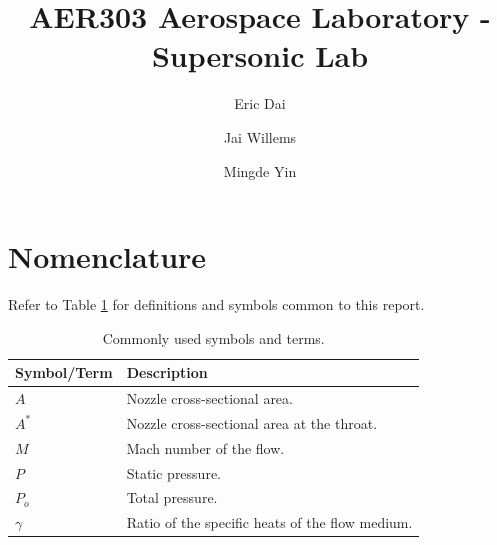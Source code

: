 \documentclass[runningheads]{llncs}
\begin{document}
\title{AER303 Aerospace Laboratory - Supersonic Lab}

\author{Eric Dai \and Jai Willems \and Mingde Yin}


\maketitle




\begin{abstract}


\end{abstract}




\newpage
\section{Nomenclature}

Refer to Table \ref{tab:nomenclature} for definitions and symbols common to this report.

\begin{table}[h]
    \centering
    \begin{tabular}{p{4.5cm}p{11cm}}
        \toprule
        Symbol/Term & Description \\
        \midrule
        $A$ & Nozzle cross-sectional area. \\
        $A^*$ & Nozzle cross-sectional area at the throat. \\
        $M$ & Mach number of the flow. \\
        $P$ & Static pressure. \\
        $P_o$ & Total pressure. \\
        $\gamma$ & Ratio of the specific heats of the flow medium. \\
        \bottomrule
    \end{tabular}
    \caption{Commonly used symbols and terms.}
    \label{tab:nomenclature}
\end{table}
\end{document}
